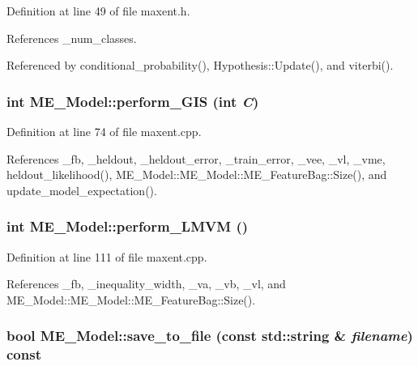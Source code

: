 Definition at line 49 of file maxent.h.

References \_\-num\_\-classes.

Referenced by conditional\_\-probability(), Hypothesis::Update(), and viterbi().\hypertarget{classME__Model_4ae94151fff132f87341a1c5f91b38d1}{
\subsubsection[{perform\_\-GIS}]{\setlength{\rightskip}{0pt plus 5cm}int ME\_\-Model::perform\_\-GIS (int {\em C})}}
\label{classME__Model_4ae94151fff132f87341a1c5f91b38d1}




Definition at line 74 of file maxent.cpp.

References \_\-fb, \_\-heldout, \_\-heldout\_\-error, \_\-train\_\-error, \_\-vee, \_\-vl, \_\-vme, heldout\_\-likelihood(), ME\_\-Model::ME\_\-Model::ME\_\-FeatureBag::Size(), and update\_\-model\_\-expectation().\hypertarget{classME__Model_754103cb516b470c0d74538e3fca78b6}{
\subsubsection[{perform\_\-LMVM}]{\setlength{\rightskip}{0pt plus 5cm}int ME\_\-Model::perform\_\-LMVM ()}}
\label{classME__Model_754103cb516b470c0d74538e3fca78b6}




Definition at line 111 of file maxent.cpp.

References \_\-fb, \_\-inequality\_\-width, \_\-va, \_\-vb, \_\-vl, and ME\_\-Model::ME\_\-Model::ME\_\-FeatureBag::Size().\hypertarget{classME__Model_f87748d7eecfe434b3d8091e0bae51b5}{
\subsubsection[{save\_\-to\_\-file}]{\setlength{\rightskip}{0pt plus 5cm}bool ME\_\-Model::save\_\-to\_\-file (const std::string \& {\em filename}) const}}
\label{classME__Model_f87748d7eecfe434b3d8091e0bae51b5}




